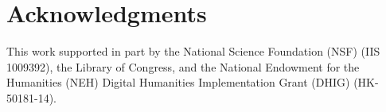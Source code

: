 \section{Acknowledgments}
This work supported in part by the National Science Foundation (NSF) (IIS 1009392), the Library of Congress, and the National Endowment for the Humanities (NEH) Digital Humanities Implementation Grant (DHIG) (HK-50181-14).


%

% 
  







